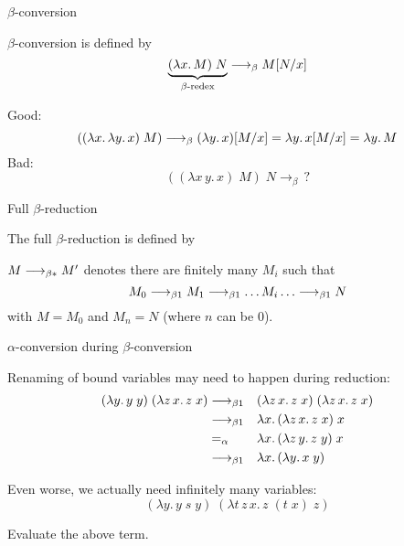 \begin{frame}{$\beta$-conversion}
\begin{definition}
  $\beta$-conversion is defined by
  \[
    \underbrace{(\lambda x.\, M)\;N}_{\beta\text{-redex}} \longrightarrow_{\beta} M\subst{N}{x}
  \]
\end{definition}
  Good: 
    \[
      ((\lambda x.\,\lambda y.\,x)\;M)
      \longrightarrow_{\beta}
      (\lambda y.\, x)\subst{M}{x}
      = \lambda y.\, x\subst{M}{x}
      = \lambda y.\, M
    \]
  Bad: 
  \[
    ((\lambda x\, y.\, x)\; M)\;N
    \longrightarrow_{\beta} \, ?
  \]
\end{frame}

\begin{frame}{Full $\beta$-reduction}
\begin{definition}
  The \alert{full $\beta$-reduction} is defined by
  \begin{multicols}{2}
    \begin{prooftree}
    \end{prooftree}
    \begin{prooftree}
    \end{prooftree}
    \begin{prooftree}
    \end{prooftree}
    \begin{prooftree}
    \end{prooftree}
  \end{multicols}
\end{definition}
  $M \reduce M'$ denotes there are finitely many $M_i$ such that 
  \[
    M_0 \onereduce M_1 \onereduce \dots M_i \dots \onereduce N 
  \]
  with $M = M_0$ and $M_n = N$ (where $n$ can be $0$). 
\end{frame}

\begin{frame}{$\alpha$-conversion during $\beta$-conversion}

  Renaming of bound variables may need to happen during reduction:
  \begin{align*}
    (\lambda y.\, y\; y)\; (\lambda z\,x.\, z\;x) 
  & \onereduce && (\lambda z\,x.\, z\;x)\; (\lambda z\,x.\, z\;x) \\
  & \onereduce && \lambda x.\, (\lambda z\,x.\, z\;x) \;x  \\
  & =_\alpha   && \lambda x.\, (\lambda z\,y.\, z\;y) \;x  \\
  & \onereduce && \lambda x.\, (\lambda y.\, x\;y)
  \end{align*}
  
  Even worse, we actually need infinitely many variables:
  \[
    (\lambda y.\,y\; s\; y)\; (\lambda t\,z\,x.\, z\; (t\; x)\; z)
  \]
  \begin{exercise*}
    Evaluate the above term.
  \end{exercise*}
\end{frame}

